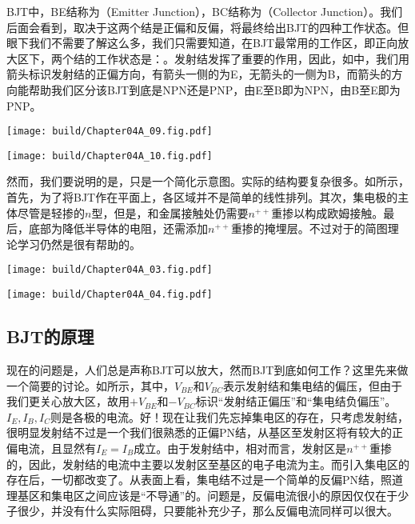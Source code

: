 BJT中，BE结称为（Emitter Junction），BC结称为（Collector Junction）。我们后面会看到，取决于这两个结是正偏和反偏，将最终给出BJT的四种工作状态。但眼下我们不需要了解这么多，我们只需要知道，在BJT最常用的工作区，即正向放大区下，两个结的工作状态是：。发射结发挥了重要的作用，因此，如中，我们用箭头标识发射结的正偏方向，有箭头一侧的为E，无箭头的一侧为B，而箭头的方向能帮助我们区分该BJT到底是NPN还是PNP，由E至B即为NPN，由B至E即为PNP。

\begin{Figure}[BJT的电路符号]
    \begin{FigureSub}[NPN的电路符号]
        \texttt{[image: build/Chapter04A\_09.fig.pdf]}
    \end{FigureSub}
    \hspace{1cm}
    \begin{FigureSub}[PNP的电路符号]
        \texttt{[image: build/Chapter04A\_10.fig.pdf]}
    \end{FigureSub}
\end{Figure}

然而，我们要说明的是，只是一个简化示意图。实际的结构要复杂很多。如所示，首先，为了将BJT作在平面上，各区域并不是简单的线性排列。其次，集电极的主体尽管是轻掺的$n$型，但是，和金属接触处仍需要$n^{++}$重掺以构成欧姆接触。最后，底部为降低半导体的电阻，还需添加$n^{++}$重掺的掩埋层。不过对于的简图理论学习仍然是很有帮助的。

\begin{Figure}[BJT的实际结构]
    \begin{FigureSub}[NPN的实际结构]
        \texttt{[image: build/Chapter04A\_03.fig.pdf]}
    \end{FigureSub}
    \hspace{0.2cm}
    \begin{FigureSub}[PNP的实际结构]
        \texttt{[image: build/Chapter04A\_04.fig.pdf]}
    \end{FigureSub}
\end{Figure}

\subsection{BJT的原理}
现在的问题是，人们总是声称BJT可以放大，然而BJT到底如何工作？这里先来做一个简要的讨论。如所示，其中，$V_{BE}$和$V_{BC}$表示发射结和集电结的偏压，但由于我们更关心放大区，故用$+V_{BE}$和$-V_{BC}$标识“发射结正偏压”和“集电结负偏压”。$I_{E},I_{B},I_C$则是各极的电流。好！现在让我们先忘掉集电区的存在，只考虑发射结，很明显发射结不过是一个我们很熟悉的正偏PN结，从基区至发射区将有较大的正偏电流，且显然有$I_E=I_B$成立。由于发射结中，相对而言，发射区是$n^{++}$重掺的，因此，发射结的电流中主要以发射区至基区的电子电流为主。而引入集电区的存在后，一切都改变了。从表面上看，集电结不过是一个简单的反偏PN结，照道理基区和集电区之间应该是“不导通”的。问题是，反偏电流很小的原因仅仅在于少子很少，并没有什么实际阻碍，只要能补充少子，那么反偏电流同样可以很大。

